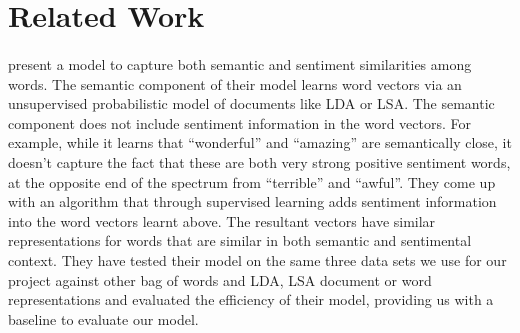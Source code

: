 \documentclass[a4paper,26pt]{article}
\begin{document}
\section{Related Work}

\paragraph{}
\cite{maas2011learning} present a model to capture both semantic and sentiment similarities among words.
The semantic component of their model learns word vectors via an unsupervised probabilistic model of documents like LDA or LSA. The semantic component does not include sentiment information in the word vectors. For example, while it learns that ``wonderful'' and ``amazing'' are semantically close, it doesn't capture the fact that these are both very strong positive
sentiment words, at the opposite end of the spectrum from ``terrible'' and ``awful''. They come up with an algorithm that through supervised learning adds sentiment information into the word vectors learnt above. The resultant vectors have similar representations for words that are similar in both semantic and sentimental context. They have tested their model on the same three data sets we use for our project against other bag of words and LDA, LSA document or word representations and evaluated the efficiency of their model, providing us with a baseline to evaluate our model. 
\end{document}

